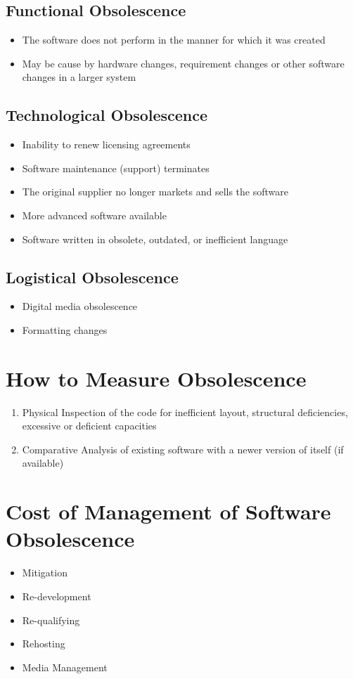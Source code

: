 \documentclass{report}
\begin{document}
		    \subsection{Functional Obsolescence}
		    	\begin{itemize}
		    		\item The software does not perform in the manner for which it was created
		    		\item May be cause by hardware changes, requirement changes or other software changes in a larger system
		    	\end{itemize}
		    \subsection{Technological Obsolescence}
		    	\begin{itemize}
		    		\item Inability to renew licensing agreements
		    		\item Software maintenance (support) terminates
		    		\item The original supplier no longer markets and sells the software
		    		\item More advanced software available
		    		\item Software written in obsolete, outdated, or inefficient language
		    	\end{itemize}
		    \subsection{Logistical Obsolescence}
		    	\begin{itemize}
		    		\item Digital media obsolescence
		    		\item Formatting changes
		    	\end{itemize}
		\section{How to Measure Obsolescence}
			\begin{enumerate}
				\item Physical Inspection of the code for inefficient layout, structural deficiencies, excessive or deficient capacities
				\item Comparative Analysis of existing software with a newer version of itself (if available)
			\end{enumerate}
		\section{Cost of Management of Software Obsolescence}
		    \begin{itemize}
		    	\item Mitigation
		    	\item Re-development
		    	\item Re-qualifying
		    	\item Rehosting
		    	\item Media Management
		    \end{itemize}
\end{document}
